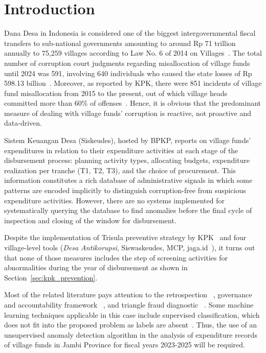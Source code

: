 \documentclass[3p,times,procedia]{elsarticle}
\begin{document}
\vspace*{-6pt}

\section{Introduction}
\label{sec:intro}


Dana Desa in Indonesia is considered one of the biggest intergovernmental fiscal transfers to sub-national governments amounting to around Rp 71 trillion annually to 75,259 villages according to Law No. 6 of 2014 on Villages~\cite{ref1}. The total number of corruption court judgments regarding misallocation of village funds until 2024 was 591, involving 640 individuals who caused the state losses of Rp 598.13 billion~\cite{ref2}. Moreover, as reported by KPK, there were 851 incidents of village fund misallocation from 2015 to the present, out of which village heads committed more than 60\% of offenses~\cite{ref3}. Hence, it is obvious that the predominant measure of dealing with village funds' corruption is reactive, not proactive and data-driven.

Sistem Keuangan Desa (Siskeudes), hosted by BPKP, reports on village funds' expenditures in relation to their expenditure activities at each stage of the disbursement process: planning activity types, allocating budgets, expenditure realization per tranche (T1, T2, T3), and the choice of procurement. This information constitutes a rich database of administrative signals in which some patterns are encoded implicitly to distinguish corruption-free from suspicious expenditure activities. However, there are no systems implemented for systematically querying the database to find anomalies before the final cycle of inspection and closing of the window for disbursement.

Despite the implementation of Trisula preventive strategy by KPK~\cite{ref4} and four village-level tools (\textit{Desa Antikorupsi}, Siswaskeudes, MCP, jaga.id~\cite{ref5,ref6,ref7,ref8,ref9}), it turns out that none of those measures includes the step of screening activities for abnormalities during the year of disbursement as shown in Section~\ref{sec:kpk_prevention}.

Most of the related literature pays attention to the retrospection ~\cite{ref10}, governance and accountability framework ~\cite{ref11}, and triangle fraud diagnostic ~\cite{ref12}. Some machine learning techniques applicable in this case include supervised classification, which does not fit into the proposed problem as labels are absent~\cite{ref13,ref14}. Thus, the use of an unsupervised anomaly detection algorithm in the analysis of expenditure records of village funds in Jambi Province for fiscal years 2023-2025 will be required.
\end{document}
